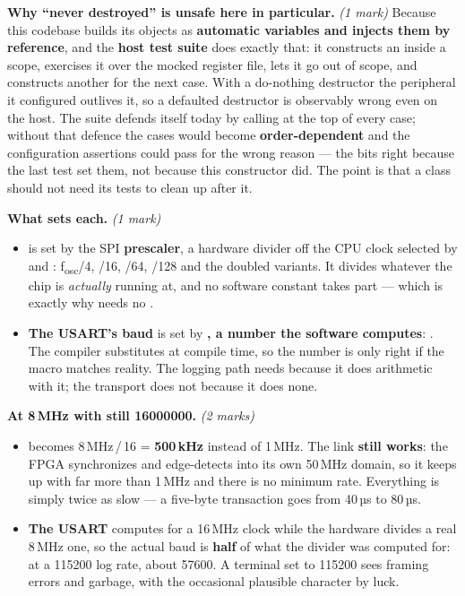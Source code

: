\textbf{Why ``never destroyed'' is unsafe here in particular.} \textit{(1 mark)} Because this
codebase builds its objects as \textbf{automatic variables and injects them by reference}, and the
\textbf{host test suite} does exactly that: it constructs an  inside a scope, exercises
it over the mocked register file, lets it go out of scope, and constructs another for the next case.
With a do-nothing destructor the peripheral it configured outlives it, so a defaulted destructor is
observably wrong even on the host. The suite defends itself today by calling 
at the top of every case; without that defence the cases would become \textbf{order-dependent} and
the configuration assertions could pass for the wrong reason --- the bits right because the last
test set them, not because this constructor did. The point is that a class should not need its tests
to clean up after it.

\textbf{What sets each.} \textit{(1 mark)}
\begin{itemize}
  \item \textbf{} is set by the SPI \textbf{prescaler}, a hardware divider off the CPU
    clock selected by  and : f\textsubscript{osc}/4, /16, /64, /128 and
    the doubled variants. It divides whatever the chip is \emph{actually} running at, and no software
    constant takes part --- which is exactly why  needs no .
  \item \textbf{The USART's baud} is set by \textbf{, a number the software computes}:
    . The compiler substitutes  at compile time,
    so the number is only right if the macro matches reality. The logging path needs 
    because it does arithmetic with it; the transport does not because it does none.
\end{itemize}

\textbf{At 8\,MHz with  still 16000000.} \textit{(2 marks)}
\begin{itemize}
  \item \textbf{} becomes 8\,MHz\,/\,16 = \textbf{500\,kHz} instead of 1\,MHz. The link
    \textbf{still works}: the FPGA synchronizes and edge-detects  into its own 50\,MHz
    domain, so it keeps up with far more than 1\,MHz and there is no minimum rate. Everything is
    simply twice as slow --- a five-byte transaction goes from 40\,µs to 80\,µs.
  \item \textbf{The USART} computes  for a 16\,MHz clock while the hardware divides a
    real 8\,MHz one, so the actual baud is \textbf{half} of what the divider was computed for: at a
    115200 log rate, about 57600. A terminal set to 115200 sees framing errors and garbage, with the
    occasional plausible character by luck.
\end{itemize}

